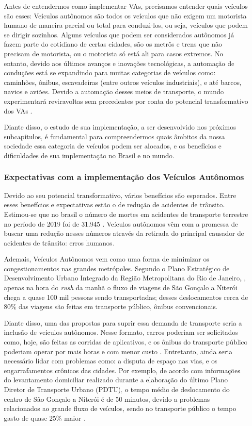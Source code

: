 Antes de entendermos como implementar VAs, precisamos entender quais veículos são esses: Veículos autônomos são todos os veículos que não exigem um motorista humano de maneira parcial ou total para conduzi-los, ou seja, veículos que podem se dirigir sozinhos. Alguns veículos que podem ser considerados autônomos já fazem parte do cotidiano de certas cidades, são os metrôs e trens que não precisam de motorista, ou o motorista só está ali para casos extremos. No entanto, devido aos últimos avanços e inovações tecnológicas, a automação de conduções está se expandindo para muitas categorias de veículos como: caminhões, ônibus, escavadeiras (entre outros veículos industriais), e até barcos, navios e aviões. Devido a automação desses meios de transporte, o mundo experimentará reviravoltas sem precedentes por conta do potencial transformativo dos VAs \cite{4cenarios_ocidental}.

Diante disso, o estudo de sua implementação, a ser desenvolvido nos próximos subcapítulos, é fundamental para compreendermos quais âmbitos da nossa sociedade essa categoria de veículos podem ser alocados, e os benefícios e dificuldades de sua implementação no Brasil e no mundo.

 \subsubsection{Expectativas com a implementação dos Veículos Autônomos}
Devido ao seu potencial transformativo, vários benefícios são esperados. Entre esses benefícios e expectativas estão o de redução de acidentes de trânsito. Estimou-se que no brasil o número de mortes em acidentes de transporte terrestre no período de 2019 foi de 31.945 \cite{Anexo_I_pnatrans}. Veículos autônomos vêm com a promessa de buscar uma redução nesses números através da retirada do principal causador de acidentes de trânsito: erros humanos. 

Ademais, Veículos Autônomos vem como uma forma de minimizar os congestionamentos nas grandes metrópoles. Segundo o  Plano Estratégico de Desenvolvimento Urbano Integrado da Região Metropolitana do Rio de Janeiro, \cite{rj_transito}, apenas na hora do \textit{rush} da manhã o fluxo de viagens de São Gonçalo a Niterói chega a quase 100 mil pessoas sendo transportadas; desses deslocamentos cerca de 80\% das viagens são feitas em transporte público, ônibus convencionais. 

Diante disso, uma das propostas para suprir essa demanda de transporte seria a inclusão de veículos autônomos. Nesse formato, carros poderiam ser solicitados como, hoje, são feitas as corridas de aplicativos, e os ônibus do transporte público  poderiam operar por mais horas e com menor custo \cite{4cenarios_ocidental}. 
Entretanto, ainda seria necessário lidar com problemas como: a disputa de espaço nas vias, e os engarrafamentos crônicos das cidades. Por exemplo, de acordo com informações do levantamento domiciliar realizado durante a elaboração do último Plano Diretor de Transporte Urbano (PDTU), o tempo médio de deslocamento do centro de São Gonçalo a Niterói é de 50 minutos, devido a problemas relacionados ao grande fluxo de veículos, sendo no transporte público o tempo gasto de quase 25\% maior \cite{rj_transito}.


